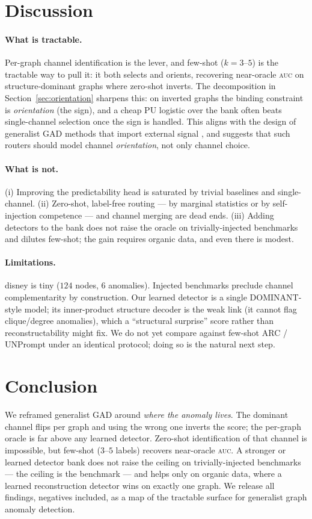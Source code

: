 \documentclass[11pt]{article}
\newcommand{\auc}{\textsc{auc}}
\begin{document}
\section{Discussion}
\label{sec:discussion}

\paragraph{What is tractable.} Per-graph channel identification is the lever, and few-shot
($k{=}3$--$5$) is the tractable way to pull it: it both selects and orients, recovering
near-oracle \auc{} on structure-dominant graphs where zero-shot inverts. The decomposition in
Section~\ref{sec:orientation} sharpens this: on inverted graphs the binding constraint is
\emph{orientation} (the sign), and a cheap PU logistic over the bank often beats single-channel
selection once the sign is handled. This aligns with the design of generalist GAD methods that
import external signal \citep{liu2024arc,niu2024unprompt,qiao2025anomalygfm}, and suggests that
such routers should model channel \emph{orientation}, not only channel choice.

\paragraph{What is not.} (i) Improving the predictability head is saturated by trivial
baselines and single-channel. (ii) Zero-shot, label-free routing --- by marginal statistics or
by self-injection competence --- and channel merging are dead ends. (iii) Adding detectors to
the bank does not raise the oracle on trivially-injected benchmarks and dilutes few-shot;
the gain requires organic data, and even there is modest.

\paragraph{Limitations.} disney is tiny ($124$ nodes, $6$ anomalies). Injected benchmarks
preclude channel complementarity by construction. Our learned detector is a single DOMINANT-
style model; its inner-product structure decoder is the weak link (it cannot flag
clique/degree anomalies), which a ``structural surprise'' score rather than reconstructability
might fix. We do not yet compare against few-shot ARC / UNPrompt under an identical protocol;
doing so is the natural next step.

\section{Conclusion}
We reframed generalist GAD around \emph{where the anomaly lives}. The dominant channel flips per
graph and using the wrong one inverts the score; the per-graph oracle is far above any learned
detector. Zero-shot identification of that channel is impossible, but few-shot ($3$--$5$ labels)
recovers near-oracle \auc{}. A stronger or learned detector bank does not raise the ceiling on
trivially-injected benchmarks --- the ceiling is the benchmark --- and helps only on organic
data, where a learned reconstruction detector wins on exactly one graph. We release all
findings, negatives included, as a map of the tractable surface for generalist graph anomaly
detection.
\end{document}
